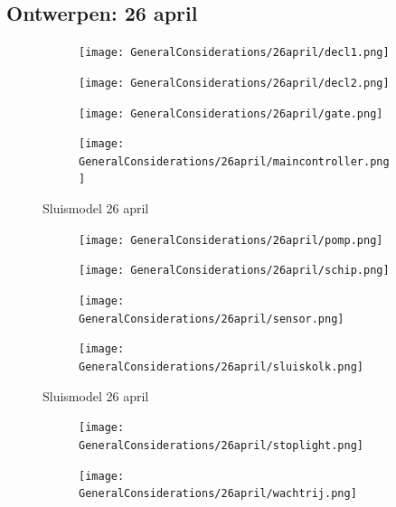 \documentclass{article}
\begin{document}
	\subsection{Ontwerpen:  26 april}
	\begin{figure}
		\centering
		\begin{subfigure}{0.45\linewidth}
			\texttt{[image: GeneralConsiderations/26april/decl1.png]}
			\caption{}
			\label{fig:1a}
		\end{subfigure}\hfill
		\begin{subfigure}{0.45\linewidth}
			\texttt{[image: GeneralConsiderations/26april/decl2.png]}
			\caption{}
			\label{fig:1a}
		\end{subfigure}
		
		\begin{subfigure}{0.45\linewidth}
			\texttt{[image: GeneralConsiderations/26april/gate.png]}
			\caption{}
			\label{fig:1a}
		\end{subfigure}\hfill
		\begin{subfigure}{0.45\linewidth}
			\texttt{[image: GeneralConsiderations/26april/maincontroller.png]}
			\caption{}
			\label{fig:1a}
		\end{subfigure}
		\caption{Sluismodel 26 april}
		\label{fig:1}
	\end{figure}
	\begin{figure}
		\centering
		\begin{subfigure}{0.45\linewidth}
			\texttt{[image: GeneralConsiderations/26april/pomp.png]}
			\caption{}
			\label{fig:1a}
		\end{subfigure}\hfill
		\begin{subfigure}{0.45\linewidth}
			\texttt{[image: GeneralConsiderations/26april/schip.png]}
			\caption{}
			\label{fig:1a}
		\end{subfigure}
		
		\begin{subfigure}{0.45\linewidth}
			\texttt{[image: GeneralConsiderations/26april/sensor.png]}
			\caption{}
			\label{fig:1a}
		\end{subfigure}\hfill
		\begin{subfigure}{0.45\linewidth}
			\texttt{[image: GeneralConsiderations/26april/sluiskolk.png]}
			\caption{}
			\label{fig:1a}
		\end{subfigure}
		\caption{Sluismodel 26 april}
		\label{fig:1}
	\end{figure}
	
	
	\begin{figure}
		\centering
		\begin{subfigure}{0.45\linewidth}
			\texttt{[image: GeneralConsiderations/26april/stoplight.png]}
			\caption{}
			\label{fig:1a}
		\end{subfigure}\hfill
		\begin{subfigure}{0.45\linewidth}
			\texttt{[image: GeneralConsiderations/26april/wachtrij.png]}
			\caption{}
			\label{fig:1a}
		\end{subfigure}
	\end{figure}
	\newpage
\end{document}
